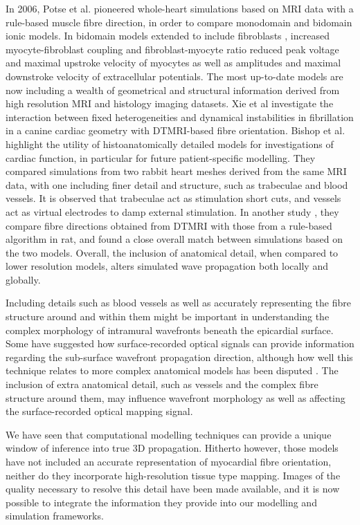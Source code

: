   In 2006, Potse et al. \cite{Potse2006} pioneered whole-heart simulations based on MRI data with a rule-based muscle fibre direction, in order to compare monodomain and bidomain ionic models. In bidomain models extended to include fibroblasts \cite{Sachse2009}, increased myocyte-fibroblast coupling and fibroblast-myocyte ratio reduced peak voltage and maximal upstroke velocity of myocytes as well as amplitudes and maximal downstroke velocity of extracellular potentials. The most up-to-date models are now including a wealth of geometrical and structural information derived from high resolution MRI and histology imaging datasets. Xie et al \cite{Xie2004} investigate the interaction between fixed heterogeneities and dynamical instabilities in fibrillation in a canine cardiac geometry with DTMRI-based fibre orientation. Bishop et al. \cite{Bishop2009} highlight the utility of histoanatomically detailed models for investigations of cardiac function, in particular for future patient-specific modelling. They compared simulations from two rabbit heart meshes derived from the same MRI data, with one including finer detail and structure, such as trabeculae and blood vessels. It is observed that trabeculae act as stimulation short cuts, and vessels act as virtual electrodes to damp external stimulation. In another study \cite{Bishop2009a}, they compare fibre directions obtained from DTMRI with those from a rule-based algorithm in rat, and found a close overall match between simulations based on the two models. Overall, the inclusion of anatomical detail, when compared to lower resolution models, alters simulated wave propagation both locally and globally.

  Including details such as blood vessels as well as accurately representing the fibre structure around and within them might be important in understanding the complex morphology of intramural wavefronts beneath the epicardial surface. Some \cite{Ding2001,Hyatt2003} have suggested how surface-recorded optical signals can provide information regarding the sub-surface wavefront propagation direction, although how well this technique relates to more complex anatomical models has been disputed \cite{Bishop2006}. The inclusion of extra anatomical detail, such as vessels and the complex fibre structure around them, may influence wavefront morphology as well as affecting the surface-recorded optical mapping signal.
  
  We have seen that computational modelling techniques can provide a unique window of inference into true 3D propagation. Hitherto however, those models have not included an accurate representation of myocardial fibre orientation, neither do they incorporate high-resolution tissue type mapping. Images of the quality necessary to resolve this detail have been made available, and it is now possible to integrate the information they provide into our modelling and simulation frameworks.


